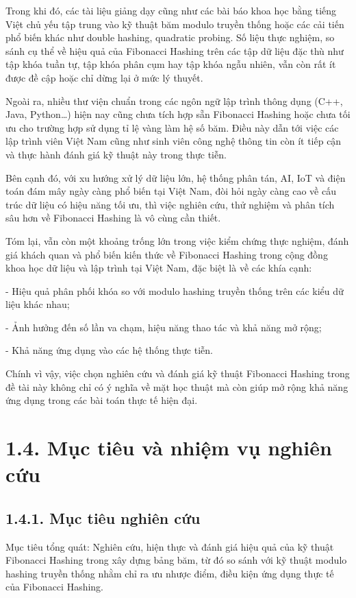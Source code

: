 \documentclass[12pt,a4paper]{report}
\begin{document}
Trong khi đó, các tài liệu giảng dạy cũng như các bài báo khoa học bằng tiếng Việt chủ yếu tập trung vào kỹ thuật băm modulo truyền thống hoặc các cải tiến phổ biến khác như double hashing, quadratic probing. Số liệu thực nghiệm, so sánh cụ thể về hiệu quả của Fibonacci Hashing trên các tập dữ liệu đặc thù như tập khóa tuần tự, tập khóa phân cụm hay tập khóa ngẫu nhiên, vẫn còn rất ít được đề cập hoặc chỉ dừng lại ở mức lý thuyết.

Ngoài ra, nhiều thư viện chuẩn trong các ngôn ngữ lập trình thông dụng (C++, Java, Python…) hiện nay cũng chưa tích hợp sẵn Fibonacci Hashing hoặc chưa tối ưu cho trường hợp sử dụng tỉ lệ vàng làm hệ số băm. Điều này dẫn tới việc các lập trình viên Việt Nam cũng như sinh viên công nghệ thông tin còn ít tiếp cận và thực hành đánh giá kỹ thuật này trong thực tiễn.

Bên cạnh đó, với xu hướng xử lý dữ liệu lớn, hệ thống phân tán, AI, IoT và điện toán đám mây ngày càng phổ biến tại Việt Nam, đòi hỏi ngày càng cao về cấu trúc dữ liệu có hiệu năng tối ưu, thì việc nghiên cứu, thử nghiệm và phân tích sâu hơn về Fibonacci Hashing là vô cùng cần thiết.

Tóm lại, vẫn còn một khoảng trống lớn trong việc kiểm chứng thực nghiệm, đánh giá khách quan và phổ biến kiến thức về Fibonacci Hashing trong cộng đồng khoa học dữ liệu và lập trình tại Việt Nam, đặc biệt là về các khía cạnh:

- Hiệu quả phân phối khóa so với modulo hashing truyền thống trên các kiểu dữ liệu khác nhau;

- Ảnh hưởng đến số lần va chạm, hiệu năng thao tác và khả năng mở rộng;

- Khả năng ứng dụng vào các hệ thống thực tiễn.

Chính vì vậy, việc chọn nghiên cứu và đánh giá kỹ thuật Fibonacci Hashing trong đề tài này không chỉ có ý nghĩa về mặt học thuật mà còn giúp mở rộng khả năng ứng dụng trong các bài toán thực tế hiện đại.

\section*{1.4. Mục tiêu và nhiệm vụ nghiên cứu}
\subsection*{1.4.1. Mục tiêu nghiên cứu}
\noindent \indent Mục tiêu tổng quát: Nghiên cứu, hiện thực và đánh giá hiệu quả của kỹ thuật Fibonacci Hashing trong xây dựng bảng băm, từ đó so sánh với kỹ thuật modulo hashing truyền thống nhằm chỉ ra ưu nhược điểm, điều kiện ứng dụng thực tế của Fibonacci Hashing.
\end{document}

